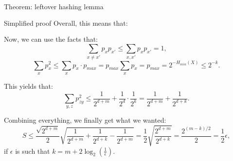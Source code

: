 \documentclass[a4paper]{article}
\begin{document}
\begin{parag}{Theorem: leftover hashing lemma}
\begin{subparag}{Simplified proof}
        Overall, this means that:

        Now, we can use the facts that: 
        \[\sum_{x \neq x'} p_x p_{x'} \leq \sum_{x, x'} p_{x} p_{x'} = 1,\]
        \[\sum_{x} p_{x}^2 \leq \sum_{x} p_x\cdot p_{max} = p_{max} \sum_{x} p_x = p_{max} = 2^{- H_{min}\left(X\right)} \leq 2^{-k}.\]
        
        This yields that: 
        \[\sum_{y, z} p_{zy}^2 \leq \frac{1}{2^{d + m}} + \frac{1}{2^d} \cdot \frac{1}{2^k} = \frac{1}{2^{d + m}} + \frac{1}{2^{d + k}}.\]
        
        Combining everything, we finally get what we wanted: 
        \[S \leq \frac{\sqrt{2^{d + m}}}{2} \sqrt{\frac{1}{2^{d+m}} + \frac{1}{2^{d + k}} - \frac{1}{2^{d + m}}} = \frac{1}{2} \sqrt{\frac{2^{d + m}}{2^{d + k}}} = \frac{2^{\left(m -k\right)/2}}{2} = \frac{1}{2} \epsilon,\]
        if $\epsilon$ is such that $k = m + 2 \log_2\left(\frac{1}{\epsilon}\right)$.
        

    \end{subparag}
\end{parag}
\end{document}
